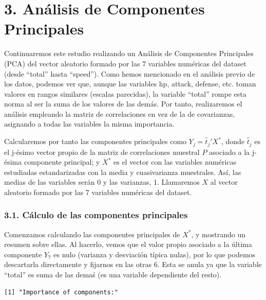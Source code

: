 \documentclass[
  12pt,
]{extreport}
\begin{document}
\chapter{3. Análisis de Componentes
Principales}\label{anuxe1lisis-de-componentes-principales}

Continuaremos este estudio realizando un Análisis de Componentes
Principales (PCA) del vector aleatorio formado por las 7 variables
numéricas del dataset (desde ``total'' hasta ``speed''). Como hemos
mencionado en el análisis previo de los datos, podemos ver que, aunque
las variables hp, attack, defense, etc. toman valores en rangos
similares (escalas parecidas), la variable ``total'' rompe esta norma al
ser la suma de los valores de las demás. Por tanto, realizaremos el
análisis empleando la matriz de correlaciones en vez de la de
covarianzas, asignando a todas las variables la misma importancia.

Calcularemos por tanto las componentes principales como
\(Y_j = \hat{t}_j'X^*\), donde \(\hat{t}_j\) es el j-ésimo vector propio
de la matriz de correlaciones muestral \(P\) asociado a la j-ésima
componente principal; y \(X^*\) es el vector con las variables numéricas
estudiadas estandarizadas con la media y cuasivarianza muestrales. Así,
las medias de las variables serán 0 y las varianzas, 1. Llamaremos \(X\)
al vector aleatorio formado por las 7 variables numéricas del dataset.

\subsection{3.1. Cálculo de las componentes
principales}\label{cuxe1lculo-de-las-componentes-principales}

Comenzamos calculando las componentes principales de \(X^*\), y
mostrando un resumen sobre ellas. Al hacerlo, vemos que el valor propio
asociado a la última componente \(Y_7\) es nulo (varianza y desviación
típica nulas), por lo que podemos descartarla directamente y fijarnos en
las otras 6. Esta se anula ya que la variable ``total'' es suma de las
demaś (es una variable dependiente del resto).

\begin{verbatim}
[1] "Importance of components:"
\end{verbatim}
\end{document}
